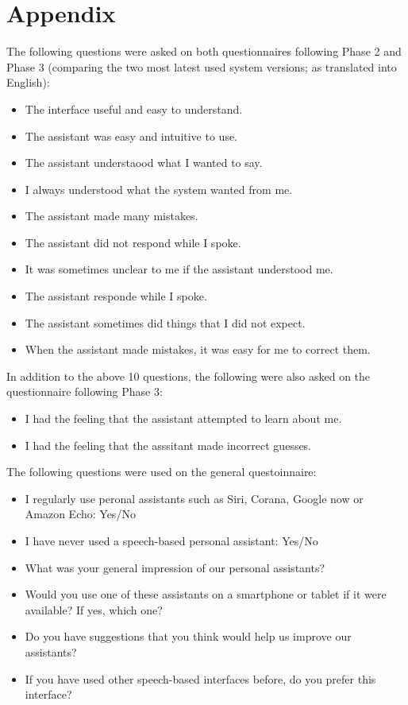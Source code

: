 \documentclass[11pt]{article}
\begin{document}
\section*{Appendix}

{\small
\noindent
The following questions were asked on both questionnaires following Phase 2 and Phase 3 (comparing the two most latest used system versions; as translated into English):
\begin{itemize}
 \item The interface useful and easy to understand.
 \item The assistant was easy and intuitive to use.
 \item The assistant understaood what I wanted to say.
 \item I always understood what the system wanted from me. 
 \item The assistant made many mistakes. 
 \item The assistant did not respond while I spoke.
 \item It was sometimes unclear to me if the assistant understood me. 
 \item The assistant responde while I spoke. 
 \item The assistant sometimes did things that I did not expect.
 \item When the assistant made mistakes, it was easy for me to correct them. 
\end{itemize}

\noindent
In addition to the above 10 questions, the following were also asked on the questionnaire following Phase 3:
\begin{itemize}
 \item I had the feeling that the assistant attempted to learn about me.
 \item I had the feeling that the asssitant made incorrect guesses. 
\end{itemize}

\noindent
The following questions were used on the general questoinnaire:
\begin{itemize}
 \item I regularly use peronal assistants such as Siri, Corana, Google now or Amazon Echo: Yes/No
 \item I have never used a speech-based personal assistant: Yes/No
 \item What was your general impression of our personal assistants?
 \item Would you use one of these assistants on a smartphone or tablet if it were available? If yes, which one?
 \item Do you have suggestions that you think would help us improve our assistants?
 \item If you have used other speech-based interfaces before, do you prefer this interface?
\end{itemize}
}




\end{document}
